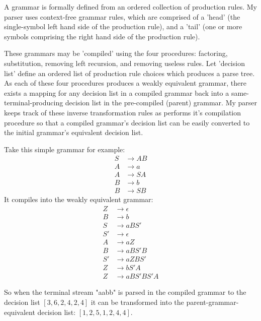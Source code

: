 \documentclass[11pt]{article}
\begin{document}
A grammar is formally defined from an ordered collection of production rules.
My parser uses context-free grammar rules, which are comprised of a
'head' (the single-symbol left hand side of the production rule), and a 'tail'
(one or more symbols comprising the right hand side of the production rule).

These grammars may be 'compiled' using the four procedures:
factoring, substitution, removing left recursion, and removing useless
rules. Let 'decision list' define an ordered list of production rule
choices which produces a parse tree.
As each of these four procedures produces a weakly equivalent grammar,
there exists a mapping for any decision list in a compiled grammar
back into a same-terminal-producing decision list in the pre-compiled (parent) grammar.
My parser keeps track of these inverse transformation rules as performs
it's compilation procedure so that a compiled grammar's decision list can be easily
converted to the initial grammar's equivalent decision list. 

Take this simple grammar for example:
\setcounter{equation}{0}
\begin{align}
S &\rightarrow A B\\
A &\rightarrow a\\
A &\rightarrow S A\\
B &\rightarrow b\\
B &\rightarrow S B
\end{align}
It compiles into the weakly equivalent grammar:
\setcounter{equation}{0}
\begin{align}
Z &\rightarrow \epsilon\\
B &\rightarrow b\\
S &\rightarrow a B S'\\
S' &\rightarrow \epsilon\\
A &\rightarrow a Z\\
B &\rightarrow a B S' B\\
S' &\rightarrow a Z B S'\\
Z &\rightarrow b S' A\\
Z &\rightarrow a B S' B S' A
\end{align}

So when the terminal stream "aabb" is parsed in the compiled
grammar to the decision list $[3, 6, 2, 4, 2, 4]$ it can be transformed
into the parent-grammar-equivalent decision list: $[1, 2, 5, 1, 2, 4, 4]$.
\end{document}

